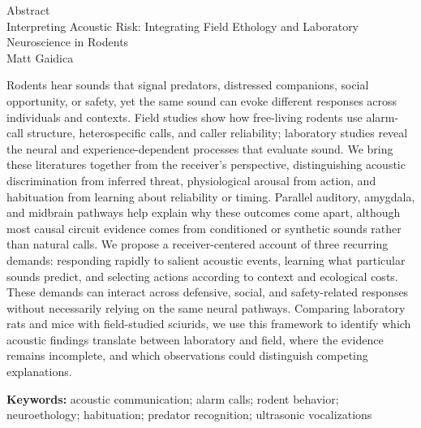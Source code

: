 \documentclass[12pt,letterpaper]{article}
\begin{document}
\begin{center}
{\LARGE Abstract}\\[0.6em]
{\large Interpreting Acoustic Risk: Integrating Field Ethology and Laboratory Neuroscience in Rodents}\\[0.35em]
{\normalsize Matt Gaidica}
\end{center}
\vspace{1.25em}
\noindent Rodents hear sounds that signal predators, distressed companions, social opportunity, or safety, yet the same sound can evoke different responses across individuals and contexts. Field studies show how free-living rodents use alarm-call structure, heterospecific calls, and caller reliability; laboratory studies reveal the neural and experience-dependent processes that evaluate sound. We bring these literatures together from the receiver's perspective, distinguishing acoustic discrimination from inferred threat, physiological arousal from action, and habituation from learning about reliability or timing. Parallel auditory, amygdala, and midbrain pathways help explain why these outcomes come apart, although most causal circuit evidence comes from conditioned or synthetic sounds rather than natural calls. We propose a receiver-centered account of three recurring demands: responding rapidly to salient acoustic events, learning what particular sounds predict, and selecting actions according to context and ecological costs. These demands can interact across defensive, social, and safety-related responses without necessarily relying on the same neural pathways. Comparing laboratory rats and mice with field-studied sciurids, we use this framework to identify which acoustic findings translate between laboratory and field, where the evidence remains incomplete, and which observations could distinguish competing explanations.

\vspace{1em}
\noindent\textbf{Keywords:} acoustic communication; alarm calls; rodent behavior; neuroethology; habituation; predator recognition; ultrasonic vocalizations
\end{document}
